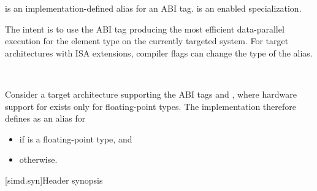 \begin{itemdescr}
\pnum
{} is an implementation-defined alias for an ABI tag.
 is an enabled specialization.
\begin{note}
The intent is to use the ABI tag producing the most efficient data-parallel
execution for the element type  on the currently
targeted system.
For target architectures with ISA extensions, compiler flags can change the
type of the  alias.
\end{note}\\
\begin{example}
  Consider a target architecture supporting the ABI tags
   and , where hardware support for
   exists only for floating-point types.
  The implementation therefore defines  as an alias for
  \begin{itemize}
    \item {} if  is a floating-point type, and
    \item {} otherwise.
  \end{itemize}
\end{example}
\end{itemdescr}

[simd.syn]{Header \texorpdfstring{}{<simd>} synopsis}

